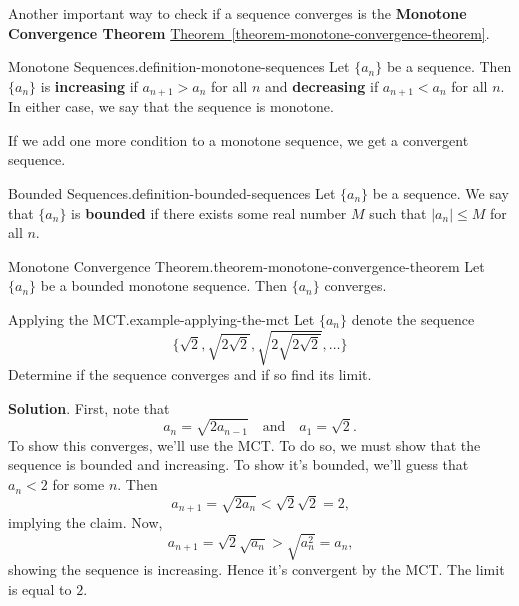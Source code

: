 \documentclass[10pt,]{book}
\newcommand{\terminology}[1]{\textbf{#1}}
\numberwithin{equation}{section}
\newcommand{\lt}{<}
\newcommand{\gt}{>}
\begin{document}
\hypertarget{p-819}{}%
Another important way to check if a sequence converges is the \terminology{Monotone Convergence Theorem} \hyperref[theorem-monotone-convergence-theorem]{Theorem~\ref{theorem-monotone-convergence-theorem}}.%
\begin{definition}{Monotone Sequences.}{definition-monotone-sequences}%
\hypertarget{p-820}{}%
Let \(\{a_{n}\}\) be a sequence. Then \(\{a_{n}\}\) is \terminology{increasing} if \(a_{n+1} \gt a_{n}\) for all \(n\) and \terminology{decreasing} if \(a_{n+1}\lt a_{n} \) for all \(n\). In either case, we say that the sequence is monotone.%
\end{definition}
\hypertarget{p-821}{}%
If we add one more condition to a monotone sequence, we get a convergent sequence.%
\begin{definition}{Bounded Sequences.}{definition-bounded-sequences}%
\hypertarget{p-822}{}%
Let \(\{a_{n}\}\) be a sequence. We say that \(\{a_{n}\}\) is \terminology{bounded} if there exists some real number \(M\) such that \(|a_{n}| \leq M\) for all \(n\).%
\end{definition}
\begin{theorem}{Monotone Convergence Theorem.}{}{theorem-monotone-convergence-theorem}%
\hypertarget{p-823}{}%
Let \(\{a_{n}\}\) be a bounded monotone sequence. Then \(\{a_{n}\}\) converges.%
\end{theorem}
\begin{example}{Applying the MCT.}{example-applying-the-mct}%
\hypertarget{p-824}{}%
Let \(\{a_{n}\}\) denote the sequence%
\begin{equation*}
\{\sqrt{2}, \sqrt{2\sqrt{2}}, \sqrt{2\sqrt{2\sqrt{2}}},\ldots\}
\end{equation*}
Determine if the sequence converges and if so find its limit.%
\par\smallskip%
\noindent\textbf{Solution}.\hypertarget{solution-170}{}\quad%
\hypertarget{p-825}{}%
First, note that%
\begin{equation*}
a_{n} = \sqrt{2a_{n-1}}\quad\text{and}\quad a_{1} = \sqrt{2}.
\end{equation*}
To show this converges, we'll use the MCT. To do so, we must show that the sequence is bounded and increasing. To show it's bounded, we'll guess that \(a_{n}\lt 2\) for some \(n\). Then%
\begin{equation*}
a_{n+1} = \sqrt{2a_{n}}\lt \sqrt{2}\sqrt{2} = 2\text{,}
\end{equation*}
implying the claim. Now,%
\begin{equation*}
a_{n+1} = \sqrt{2}\sqrt{a_{n}} \gt \sqrt{a_{n}^{2}} = a_{n}\text{,}
\end{equation*}
showing the sequence is increasing. Hence it's convergent by the MCT. The limit is equal to \(2\).%
\end{example}
%
%
\typeout{************************************************}
\typeout{************************************************}
%
\end{document}
